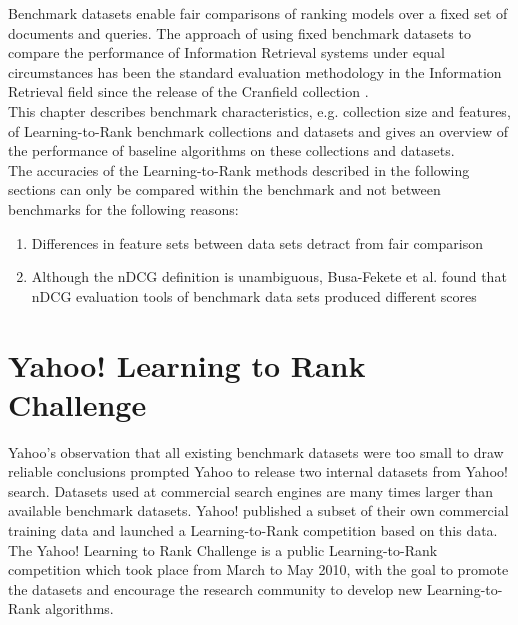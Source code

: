 \label{chap:benchmark_results}
Benchmark datasets enable fair comparisons of ranking models over a fixed set of documents and queries. The approach of using fixed benchmark datasets to compare the performance of Information Retrieval systems under equal circumstances has been the standard evaluation methodology in the Information Retrieval field since the release of the Cranfield collection \cite{Cleverdon1966}.\\

This chapter describes benchmark characteristics, e.g. collection size and features, of Learning-to-Rank benchmark collections and datasets and gives an overview of the performance of baseline algorithms on these collections and datasets.\\

The accuracies of the Learning-to-Rank methods described in the following sections can only be compared within the benchmark and not between benchmarks for the following reasons:
\begin{enumerate}
\item Differences in feature sets between data sets detract from fair comparison
\item Although the \ac{nDCG} definition is unambiguous, Busa-Fekete et al. \cite{Busa-Fekete2012} found that \ac{nDCG} evaluation tools of benchmark data sets produced different scores
\end{enumerate}

\section{Yahoo! Learning to Rank Challenge}
Yahoo's observation that all existing benchmark datasets were too small to draw reliable conclusions prompted Yahoo to release two internal datasets from Yahoo! search. Datasets used at commercial search engines are many times larger than available benchmark datasets. Yahoo! published a subset of their own commercial training data and launched a Learning-to-Rank competition based on this data. The Yahoo! Learning to Rank Challenge \cite{Chapelle2011a} is a public Learning-to-Rank competition which took place from March to May 2010, with the goal to promote the datasets and encourage the research community to develop new Learning-to-Rank algorithms.\\

